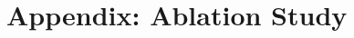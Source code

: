 \documentclass[11pt]{article}
\begin{document}


%



\newpage
\appendix
\onecolumn
\section{Appendix: Ablation Study}\nopagebreak[4]
\label{sec:appendixA}
\end{document}
